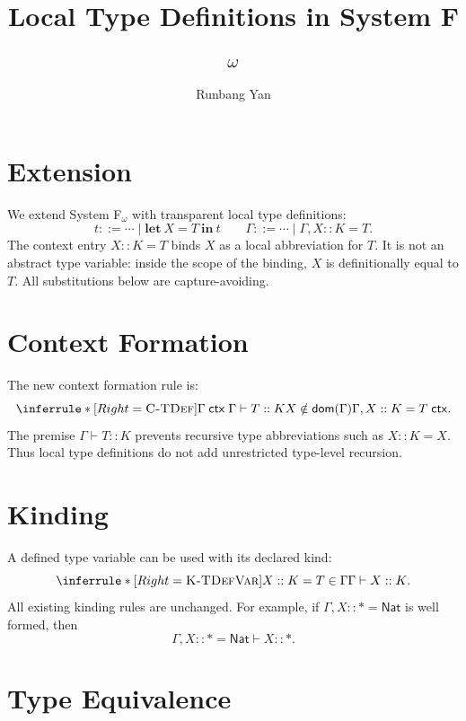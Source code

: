 \documentclass[nonacm]{acmart}
\newcommand{\ctx}{\mathrel{\mathsf{ctx}}}
\newcommand{\dom}{\mathsf{dom}}
\begin{document}
\title{Local Type Definitions in System F$_\omega$}

\author{Runbang Yan}

\renewcommand{\shortauthors}{Yan}

\maketitle

\section{Extension}

We extend System F$_\omega$ with transparent local type definitions:
\[
t ::= \cdots \mid \mathbf{let}\ X = T\ \mathbf{in}\ t
\qquad
\Gamma ::= \cdots \mid \Gamma, X :: K = T .
\]
The context entry $X :: K = T$ binds $X$ as a local abbreviation for $T$.
It is not an abstract type variable: inside the scope of the binding, $X$ is definitionally equal to $T$.
All substitutions below are capture-avoiding.

\section{Context Formation}

The new context formation rule is:
\[
\inferrule*[Right=\textsc{C-TDef}]
  {
    \Gamma \ctx
    \\
    \Gamma \vdash T :: K
    \\
    X \notin \dom(\Gamma)
  }
  {
    \Gamma, X :: K = T \ctx
  }.
\]
The premise $\Gamma \vdash T :: K$ prevents recursive type abbreviations such as
$X :: K = X$.
Thus local type definitions do not add unrestricted type-level recursion.

\section{Kinding}

A defined type variable can be used with its declared kind:
\[
\inferrule*[Right=\textsc{K-TDefVar}]
  {
    X :: K = T \in \Gamma
  }
  {
    \Gamma \vdash X :: K
  }.
\]
All existing kinding rules are unchanged.
For example, if $\Gamma, X :: * = \mathsf{Nat}$ is well formed, then
\[
\Gamma, X :: * = \mathsf{Nat} \vdash X :: *.
\]

\section{Type Equivalence}
\end{document}
